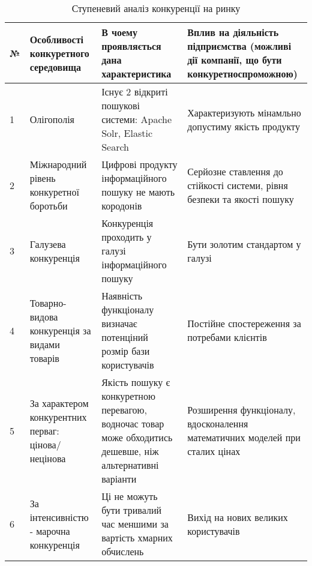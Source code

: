 \begin{table}
  \begin{tabular}
    {|l|p{4cm}|p{4cm}|p{4cm}|} \hline
    № & Особливості конкуретного середовища & В чоему проявляється дана характеристика & Вплив на діяльність підприємства (можливі дії компанії, що бути конкуретноспроможною) \\ \hline
    1 & Олігополія & Існує 2 відкриті пошукові системи: Apache Solr, Elastic Search & Характеризують мінамльно допустиму якість продукту \\ \hline
    2 & Міжнародний рівень конкуретної боротьби & Цифрові продукту інформаційного пошуку не мають кородонів & Серйозне ставлення до стійкості системи, рівня безпеки та якості пошуку \\ \hline
    3 & Галузева конкуренція & Конкуренція проходить у галузі інформаційного пошуку & Бути золотим стандартом у галузі \\ \hline
    4 & Товарно-видова конкуренція за видами товарів & Наявність функціоналу визначає потенціний розмір бази користувачів & Постійне спостереження за потребами клієнтів \\ \hline
    5 & За характером конкурентних перваг: цінова/нецінова & Якість пошуку є конкуретною перевагою, водночас товар може обходитись дешевше, ніж альтернативні варіанти & Розширення функціоналу, вдосконалення математичних моделей при сталих цінах \\ \hline
    6 & За інтенсивністю - марочна конкуренція & Ці не можуть бути тривалий час меншими за вартість хмарних обчислень & Вихід на нових великих користувачів \\ \hline
  \end{tabular}
  \caption{Ступеневий аналіз конкуренції на ринку}
\end{table}

